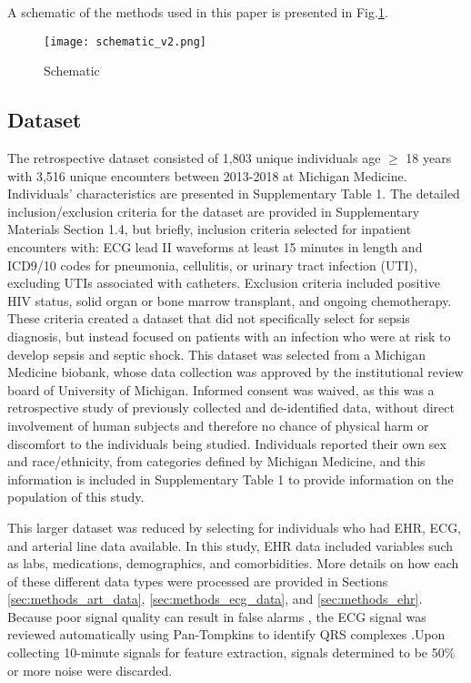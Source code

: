 
A schematic of the methods used in this paper is presented in Fig.\ref{fig:schematic}.

\begin{figure}[htb]
    \centering
    \texttt{[image: schematic\_v2.png]}
    \caption{Schematic}
    \label{fig:schematic}
\end{figure}

\subsection{Dataset} \label{sec:methods_dataset}

The retrospective dataset consisted of 1,803 unique individuals age $\geq$ 18 years with 3,516 unique encounters between 2013-2018 at Michigan Medicine. Individuals' characteristics are presented in Supplementary Table 1. The detailed inclusion/exclusion criteria for the dataset are provided in Supplementary Materials Section 1.4, but briefly, inclusion criteria selected for inpatient encounters with: ECG lead II waveforms at least 15 minutes in length and ICD9/10 codes for pneumonia, cellulitis, or urinary tract infection (UTI), excluding UTIs associated with catheters. Exclusion criteria included positive HIV status, solid organ or bone marrow transplant, and ongoing chemotherapy. These criteria created a dataset that did not specifically select for sepsis diagnosis, but instead focused on patients with an infection who were at risk to develop sepsis and septic shock. This dataset was selected from a Michigan Medicine biobank, whose data collection was approved by the institutional review board of University of Michigan. Informed consent was waived, as this was a retrospective study of previously collected and de-identified data, without direct involvement of human subjects and therefore no chance of physical harm or discomfort to the individuals being studied. Individuals reported their own sex and race/ethnicity, from categories defined by Michigan Medicine, and this information is included in Supplementary Table 1 to provide information on the population of this study.

This larger dataset was reduced by selecting for individuals who had EHR, ECG, and arterial line data available. In this study, EHR data included variables such as labs, medications, demographics, and comorbidities. More details on how each of these different data types were processed are provided in Sections \ref{sec:methods_art_data}, \ref{sec:methods_ecg_data}, and \ref{sec:methods_ehr}. Because poor signal quality can result in false alarms \cite{gambarotta_review_2016}, the ECG signal was reviewed automatically using Pan-Tompkins to identify QRS complexes \cite{pantom_1985, matlab-pantom}.Upon collecting 10-minute signals for feature extraction, signals determined to be 50\% or more noise were discarded.


